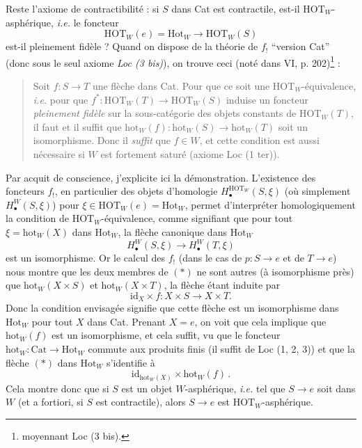 Reste l'axiome de contractibilité : si $S$ dans Cat est contractile, est-il $\mathrm{HOT}_W$-asphérique, \textit{i.e.} le foncteur
\[
\mathrm{HOT}_W(e) = \mathrm{Hot}_W \longrightarrow \mathrm{HOT}_W(S)
\]
est-il pleinement fidèle ? Quand on dispose de la théorie de $f_!$ “version Cat” (donc sous le seul axiome \textit{Loc (3 bis)}), on trouve ceci (noté dans VI, p. 202)\footnote[52]{moyennant Loc (3 bis).} :
\begin{quote}
Soit $f : S \longrightarrow T$ une flèche dans Cat. Pour que ce soit une $\mathrm{HOT}_W$-équivalence, \textit{i.e.} pour que $f^* : \mathrm{HOT}_W(T) \longrightarrow \mathrm{HOT}_W(S)$ induise un foncteur \textit{pleinement fidèle} sur la sous-catégorie des objets constants de $\mathrm{HOT}_W(T)$, il faut et il suffit que $\mathrm{hot}_W(f) : \mathrm{hot}_W(S) \longrightarrow \mathrm{hot}_W(T)$ soit un isomorphisme. Donc il \textit{suffit} que $f \in W$, et cette condition est aussi nécessaire si $W$ est fortement saturé (axiome Loc (1 ter)).
\end{quote}
Par acquit de conscience, j'explicite ici la démonstration. L'existence des foncteurs
$f_!$, en particulier des objets d'homologie $H_\bullet^{\mathrm{HOT}_W}(S,\xi)$ (où simplement $H_\bullet^W(S,\xi)$) pour $\xi \in \mathrm{HOT}_W(e) = \mathrm{Hot}_W$, permet d'interpréter homologiquement la condition de $\mathrm{HOT}_W$-équivalence, comme signifiant que pour tout $\xi = \mathrm{hot}_W(X)$ dans $\mathrm{Hot}_W$, la flèche canonique dans $\mathrm{Hot}_W$ %
\[
H_\bullet^W(S,\xi) \longrightarrow H_\bullet^W(T,\xi) \tag*{$(*)$}
\]
est un isomorphisme. Or le calcul des $f_!$ (dans le cas de $p : S \longrightarrow e$ et de $T \longrightarrow e$) nous montre que les deux membres de $(*)$ ne sont autres (à isomorphisme près) que $\mathrm{hot}_W(X \times S)$ et $\mathrm{hot}_W(X \times T)$, la flèche étant induite par
\[
\mathrm{id}_X \times f : X \times S \longrightarrow X \times T. \tag*{$(*)$}
\]
Donc la condition envisagée signifie que cette flèche est un isomorphisme dans $\mathrm{Hot}_W$ pour tout $X$ dans Cat. Prenant $X = e$, on voit que cela implique que $\mathrm{hot}_W(f)$ est un isomorphisme, et cela suffit, vu que le
foncteur $\mathrm{hot}_W : \mathrm{Cat} \longrightarrow \mathrm{Hot}_W$ commute aux produits finis (il suffit de Loc (1, 2, 3)) et que la flèche $(*)$ dans $\mathrm{Hot}_W$ s'identifie à
\[
\mathrm{id}_{\mathrm{hot}_W(X)} \times \mathrm{hot}_W(f)\,.
\]
Cela montre donc que si $S$ est un objet $W$-asphérique, \textit{i.e.} tel que $S \longrightarrow e$ soit dans $W$ (et a fortiori, si $S$ est contractile), alors $S \longrightarrow e$ est $\mathrm{HOT}_W$-asphérique.

